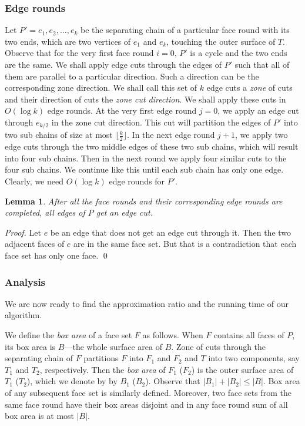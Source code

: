 \documentclass{llncs}
\newtheorem{lem}{Lemma}
\begin{document}
\subsubsection{Edge rounds}
Let ${P'}=e_1,e_2,\ldots,e_k$ be the separating chain of a particular face round
with its two ends, which are two vertices of $e_1$ and $e_k$, touching the outer surface of $T$.
Observe that for the very first face round $i=0$, $P'$ is a cycle and the two ends are the same.
We shall apply edge cuts through the edges of $P'$ such that all of them are parallel to a particular direction.
Such a direction can be the corresponding zone direction.
We shall call this set of $k$ edge cuts a \emph{zone} of cuts and their direction of cuts the \emph{zone cut direction}.
We shall apply these cuts in $O(\log k)$ edge rounds.
At the very first edge round $j=0$, we apply an edge cut through $e_{k/2}$ in the zone cut direction.
This cut will partition the edges of $P'$ into two sub chains of size at most $\lfloor\frac{k}{2}\rfloor$. 
In the next edge round $j+1$, we apply two edge cuts through the two middle edges of these two sub chains,
which will result into four sub chains.
Then in the next round we apply four similar cuts to the four sub chains.
We continue like this until each sub chain has only one edge.
Clearly, we need $O(\log k)$ edge rounds for ${P'}$. 

\begin{lem}
After all the face rounds and their corresponding edge rounds are completed, all edges of $P$ get an edge cut.
\end{lem}

\begin{proof}
Let $e$ be an edge that does not get an edge cut through it. 
Then the two adjacent faces of $e$ are in the same face set.
But that is a contradiction that each face set has only one face.
\qed
\end{proof}


\subsubsection{Analysis}
We are now ready to find the approximation ratio and the running time of our algorithm.

We define the \emph{box area} of a face set $F$ as follows.
When $F$ contains all faces of $P$, its box area is $B$---the whole surface area of $B$.
Zone of cuts through the separating chain of $F$ partitions $F$ into $F_1$ and $F_2$
and $T$ into two components, say $T_1$ and $T_2$, respectively.
Then the \emph{box area} of $F_1$ ($F_2$) is the outer surface area of $T_1$ ($T_2$),
which we denote by by $B_1$ ($B_2$).
Observe that $|B_1|+|B_2|\le |B|$.
Box area of any subsequent face set is similarly defined.
Moreover, two face sets from the same face round have their box areas disjoint
and in any face round sum of all box area is at most $|B|$.
\end{document}
